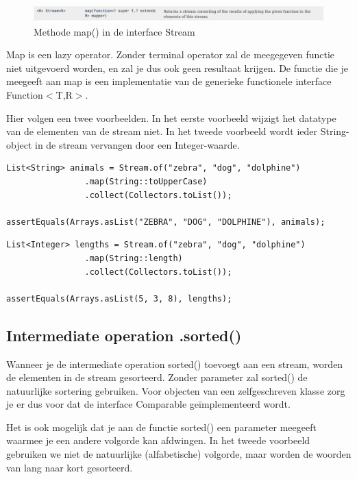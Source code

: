 \documentclass{tstextbook}
\begin{document}
\begin{figure}[H]
  \includegraphics[width=\linewidth]{images/h6/stream_map.png}
  \caption{Methode map() in de interface Stream}
  \label{fig:stream_foreach}
\end{figure}

Map is een lazy operator. Zonder terminal operator zal de meegegeven functie niet uitgevoerd worden, en zal je dus ook geen resultaat krijgen. De functie die je meegeeft aan map is een implementatie van de generieke functionele interface Function$<$T,R$>$.

Hier volgen een twee voorbeelden. In het eerste voorbeeld wijzigt het datatype van de elementen van de stream niet. In het tweede voorbeeld wordt ieder String-object in de stream vervangen door een Integer-waarde.

\begin{lstlisting}
List<String> animals = Stream.of("zebra", "dog", "dolphine")
				.map(String::toUpperCase)
				.collect(Collectors.toList());

assertEquals(Arrays.asList("ZEBRA", "DOG", "DOLPHINE"), animals);
\end{lstlisting}

\begin{lstlisting}
List<Integer> lengths = Stream.of("zebra", "dog", "dolphine")
				.map(String::length)
				.collect(Collectors.toList());

assertEquals(Arrays.asList(5, 3, 8), lengths);
\end{lstlisting}

\subsection{Intermediate operation .sorted()}

Wanneer je de intermediate operation sorted() toevoegt aan een stream, worden de elementen in de stream gesorteerd. Zonder parameter zal sorted() de natuurlijke sortering gebruiken. Voor objecten van een zelfgeschreven klasse zorg je er dus voor dat de interface Comparable ge\"implementeerd wordt.

Het is ook mogelijk dat je aan de functie sorted() een parameter meegeeft waarmee je een andere volgorde kan afdwingen. In het tweede voorbeeld gebruiken we niet de natuurlijke (alfabetische) volgorde, maar worden de woorden van lang naar kort gesorteerd.
\end{document}
